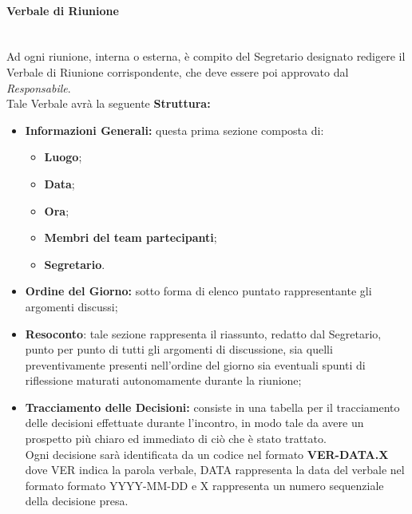 \paragraph{Verbale di Riunione} ~\\
\label{VdR}
	Ad ogni riunione, interna o esterna, è compito del Segretario designato redigere il Verbale di Riunione 							corrispondente, che deve essere poi approvato dal \textit{Responsabile}.\\
	Tale Verbale avrà la seguente \textbf{Struttura:}
	\begin{itemize}
	\item \textbf{Informazioni Generali:} questa prima sezione composta di:
		\begin{itemize}
		\item \textbf{Luogo};
		\item \textbf{Data};
		\item \textbf{Ora};
		\item \textbf{Membri del team partecipanti};
		\item \textbf{Segretario}.
		\end{itemize}
	\item \textbf{Ordine del Giorno:} sotto forma di elenco puntato rappresentante gli argomenti discussi;
	\item \textbf{Resoconto}: tale sezione rappresenta il riassunto, redatto dal Segretario, punto per punto di tutti 		gli argomenti di discussione, sia quelli preventivamente presenti nell'ordine del giorno sia eventuali spunti 				di riflessione maturati autonomamente durante la riunione;
	\item \textbf{Tracciamento delle Decisioni:} consiste in una tabella per il tracciamento delle decisioni effettuate durante l'incontro, in modo tale da avere un prospetto più chiaro ed immediato di ciò che è stato trattato. \\
	Ogni decisione sarà identificata da un codice nel formato \textbf{VER-DATA.X} dove VER indica la parola verbale, DATA rappresenta la data del verbale nel formato formato YYYY-MM-DD e X rappresenta un numero sequenziale della decisione presa.
	
	\end{itemize}
